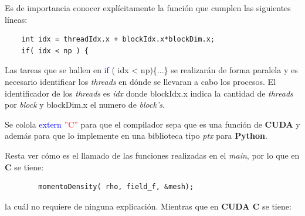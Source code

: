 Es de importancia conocer explícitamente la función que cumplen las siguientes líneas:

{\footnotesize
	\begin{frame}{}
		\begin{lstlisting}
	int idx = threadIdx.x + blockIdx.x*blockDim.x;	
	if( idx < np ) {	
		\end{lstlisting}
		
	\end{frame}
}

Las tareas que se hallen en \textcolor{blue}{if} ( idx < np)\{...\} se realizarán de forma paralela y es necesario identificar los \textit{threads} en dónde se llevaran a cabo los procesos. El identificador de los \textit{threads} es \textit{idx} donde blockIdx.x  indica la cantidad de \textit{threads} por \textit{block} y blockDim.x el numero de \textit{block's}.

Se colola \textcolor{blue}{extern} \textcolor{red}{''C''} para que el compilador sepa que es una función de \textbf{CUDA} y además para que lo implemente en una biblioteca tipo \textit{ptx} para \textbf{Python}.

Resta ver cómo es el llamado de las funciones realizadas en el \textit{main}, por lo que en \textbf{C} se tiene:


{\footnotesize
	\begin{frame}{}
		\begin{lstlisting}
		momentoDensity( rho, field_f, &mesh);
		\end{lstlisting}
		
	\end{frame}
}

la cuál no requiere de ninguna explicación. Mientras que en \textbf{CUDA C} se tiene:


